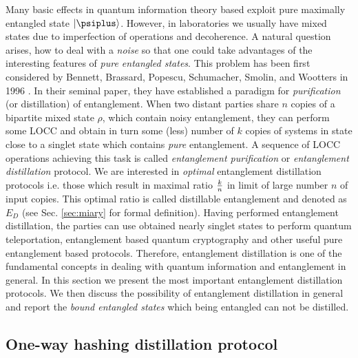 \documentclass[twocolumn,aps,rmp]{revtex4}
\begin{document}
Many basic effects in quantum information theory based exploit pure
maximally entangled state $|\psiplus \rangle$.  However, in
laboratories we usually have mixed states due to imperfection of
operations and decoherence. A natural question arises, how to deal
with a {\it noise} so that one could take advantages of the
interesting features of {\it pure entangled states}. This problem has
been first considered by Bennett, Brassard, Popescu, Schumacher,
Smolin, and Wootters in 1996 \cite{BBPSSW1996}. In their seminal
paper, they have established a paradigm for {\it purification} (or
distillation) of entanglement.  When two distant parties share $n$
copies of a bipartite mixed state $\rho$, which contain noisy
entanglement, they can perform some LOCC and obtain in turn some
(less) number of $k$ copies of systems in state close to a singlet
state which contains {\it pure} entanglement. A sequence of LOCC
operations achieving this task is called {\it entanglement
  purification} or {\it entanglement distillation} protocol. We are
interested in {\it optimal} entanglement distillation protocols
i.e. those which result in maximal ratio $k\over n$ in limit of large
number $n$ of input copies. This optimal ratio is called distillable
entanglement and denoted as $E_D$ (see Sec. \ref{sec:miary} for formal
definition). Having performed entanglement distillation, the parties
can use obtained nearly singlet states to perform quantum
teleportation, entanglement based quantum cryptography and other
useful pure entanglement based protocols. Therefore, entanglement
distillation is one of the fundamental concepts in dealing with
quantum information and entanglement in general. In this section we
present the most important entanglement distillation protocols. We
then discuss the possibility of entanglement distillation in general
and report the {\it bound entangled states} which being entangled can
not be distilled.



\subsection{One-way hashing distillation protocol}
\label{subsec:onewayhash}
\end{document}
